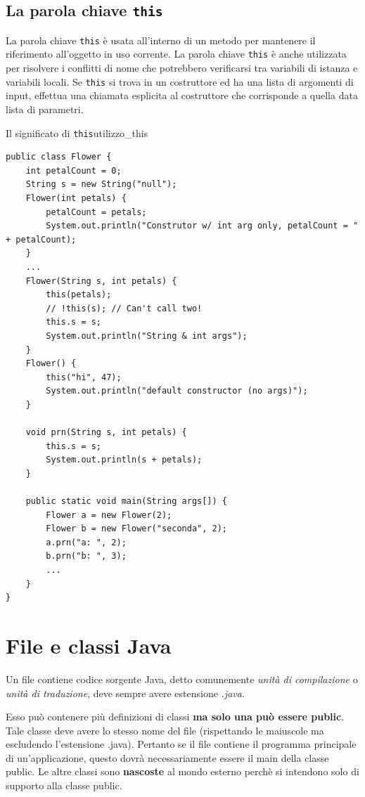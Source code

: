 \documentclass[12pt]{report}
\newcommand{\nmu}{}
\begin{document}
\subsection{La parola chiave \texttt{this}}
La parola chiave \texttt{this} è usata all'interno di un metodo per mantenere il riferimento all'oggetto in uso corrente. La parola chiave \texttt{this} è anche utilizzata per risolvere i conflitti di nome che potrebbero verificarsi tra variabili di istanza e variabili locali. Se \texttt{this} si trova in un costruttore ed ha una lista di argomenti di input, effettua una chiamata esplicita al costruttore che corrisponde a quella data lista di parametri.
\begin{example}{\nmu Il significato di \texttt{this}}{utilizzo_this}
\begin{lstlisting}[style=javastyle]
public class Flower {
	int petalCount = 0;
	String s = new String("null");
	Flower(int petals) {
		petalCount = petals;
		System.out.println("Construtor w/ int arg only, petalCount = " + petalCount);
	}
	...
	Flower(String s, int petals) {
		this(petals);
		// !this(s); // Can't call two!
		this.s = s;
		System.out.println("String & int args");
	}
	Flower() {
		this("hi", 47);
		System.out.println("default constructor (no args)");
	}

	void prn(String s, int petals) {
		this.s = s;
		System.out.println(s + petals);
	}

	public static void main(String args[]) {
		Flower a = new Flower(2);
		Flower b = new Flower("seconda", 2);
		a.prn("a: ", 2);
		b.prn("b: ", 3);
		...
	}
}
\end{lstlisting}
\end{example}
\section{File e classi Java}
Un file contiene codice sorgente Java, detto comunemente \textit{unità di compilazione} o \textit{unità di traduzione}, deve sempre avere estensione \textit{.java}.

Esso può contenere più definizioni di classi \textbf{ma solo una può essere public}. Tale classe deve avere lo stesso nome del file (rispettando le maiuscole ma escludendo l'estensione .java). Pertanto se il file contiene il programma principale di un'applicazione, questo dovrà necessariamente essere il main della classe public. Le altre classi sono \textbf{nascoste} al mondo esterno perchè si intendono solo di supporto alla classe public.
\end{document}
